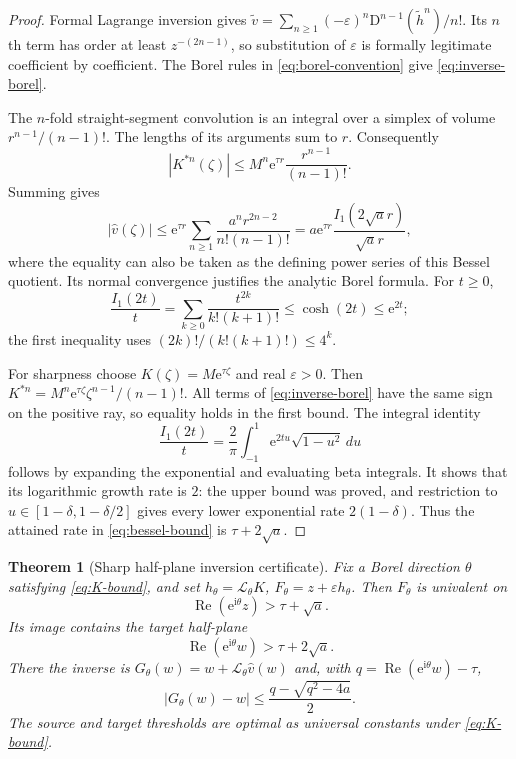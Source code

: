 \documentclass[11pt,a4paper]{article}
\numberwithin{equation}{section}
\newtheorem{theorem}{Theorem}[section]
\theoremstyle{definition}
\theoremstyle{remark}
\newcommand{\D}{\mathrm D}
\newcommand{\ii}{\mathrm i}
\newcommand{\e}{\mathrm e}
\newcommand{\Lap}{\mathcal L}
\newcommand{\Rea}{\operatorname{Re}}
\begin{document}
\begin{proof}
Formal Lagrange inversion gives
$\widetilde v=\sum_{n\ge1}(-\varepsilon)^n
\D^{n-1}(\widetilde h^n)/n!$. Its $n$th term has order at least
$z^{-(2n-1)}$, so substitution of $\varepsilon$ is formally legitimate
coefficient by coefficient. The Borel rules in
\eqref{eq:borel-convention} give \eqref{eq:inverse-borel}.

The $n$-fold straight-segment convolution is an integral over a simplex
of volume $r^{n-1}/(n-1)!$. The lengths of its arguments sum to $r$.
Consequently
\begin{equation}\label{eq:simplex-bound}
 |K^{*n}(\zeta)|\le
 M^n\e^{\tau r}\frac{r^{n-1}}{(n-1)!}.
\end{equation}
Summing gives
\[
 |\widehat v(\zeta)|\le\e^{\tau r}
 \sum_{n\ge1}\frac{a^n r^{2n-2}}{n!(n-1)!}
 =a\e^{\tau r}\frac{I_1(2\sqrt a r)}{\sqrt a r},
\]
where the equality can also be taken as the defining power series of
this Bessel quotient. Its normal convergence justifies the analytic
Borel formula. For $t\ge0$,
\[
 \frac{I_1(2t)}t=\sum_{k\ge0}\frac{t^{2k}}{k!(k+1)!}
 \le\cosh(2t)\le\e^{2t};
\]
the first inequality uses
$(2k)!/(k!(k+1)!)\le4^k$.

For sharpness choose $K(\zeta)=M\e^{\tau\zeta}$ and real
$\varepsilon>0$. Then
$K^{*n}=M^n\e^{\tau\zeta}\zeta^{n-1}/(n-1)!$.
All terms of \eqref{eq:inverse-borel} have the same sign on the
positive ray, so equality holds in the first bound.
The integral identity
\[
 \frac{I_1(2t)}t=\frac2\pi\int_{-1}^{1}
 \e^{2tu}\sqrt{1-u^2}\,du
\]
follows by expanding the exponential and evaluating beta integrals.
It shows that its logarithmic growth rate is $2$: the upper bound
was proved, and restriction to $u\in[1-\delta,1-\delta/2]$ gives
every lower exponential rate $2(1-\delta)$. Thus the attained rate
in \eqref{eq:bessel-bound} is $\tau+2\sqrt a$.
\end{proof}

\begin{theorem}[Sharp half-plane inversion certificate]\label{thm:halfplane}
Fix a Borel direction $\theta$ satisfying \eqref{eq:K-bound}, and set
$h_\theta=\Lap_\theta K$, $F_\theta=z+\varepsilon h_\theta$.
Then $F_\theta$ is univalent on
\begin{equation}\label{eq:source-halfplane}
 \Rea(\e^{\ii\theta}z)>\tau+\sqrt a.
\end{equation}
Its image contains the target half-plane
\begin{equation}\label{eq:target-halfplane}
 \Rea(\e^{\ii\theta}w)>\tau+2\sqrt a.
\end{equation}
There the inverse is $G_\theta(w)=w+\Lap_\theta\widehat v(w)$ and,
with $q=\Rea(\e^{\ii\theta}w)-\tau$,
\begin{equation}\label{eq:catalan-displacement}
 |G_\theta(w)-w|\le\frac{q-\sqrt{q^2-4a}}2.
\end{equation}
The source and target thresholds are optimal as universal constants
under \eqref{eq:K-bound}.
\end{theorem}
\end{document}
